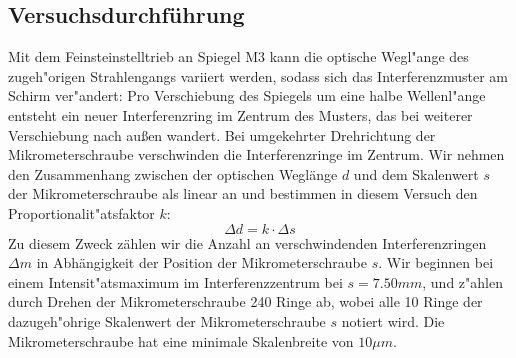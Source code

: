 \documentclass[12pt,a4paper]{article}
\begin{document}
\subsection{Versuchsdurchführung}
Mit dem Feinsteinstelltrieb an Spiegel M3 kann die optische Wegl"ange des zugeh"origen Strahlengangs variiert werden, sodass sich das Interferenzmuster am Schirm ver"andert: Pro Verschiebung des Spiegels um eine halbe Wellenl"ange entsteht ein neuer Interferenzring im Zentrum des Musters, das bei weiterer Verschiebung nach au\ss en wandert. Bei umgekehrter Drehrichtung der Mikrometerschraube verschwinden die Interferenzringe im Zentrum. Wir nehmen den Zusammenhang zwischen der optischen Weglänge $d$ und dem Skalenwert $s$ der Mikrometerschraube als linear an und bestimmen in diesem Versuch den Proportionalit"atsfaktor $k$:
\begin{equation}\label{eq:d=ks}
\Delta d=k\cdot \Delta s
\end{equation}
Zu diesem Zweck zählen wir die Anzahl an verschwindenden Interferenzringen $\Delta m$ in Abhängigkeit der Position der Mikrometerschraube $s$.
Wir beginnen bei einem Intensit"atsmaximum im Interferenzzentrum bei $s=7.50mm$, und z"ahlen durch Drehen der Mikrometerschraube 240 Ringe ab, wobei alle 10 Ringe der dazugeh"ohrige Skalenwert der Mikrometerschraube $s$ notiert wird. Die Mikrometerschraube hat eine minimale Skalenbreite von $10\mu m$.
\end{document}
